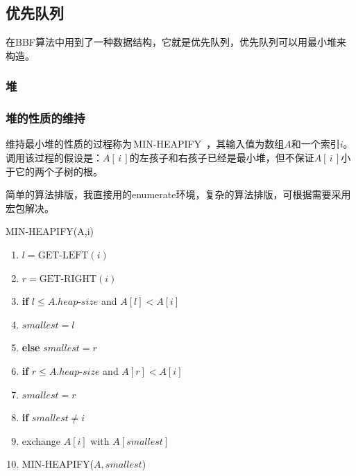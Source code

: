 \documentclass[10.5pt,a4paper]{article}
\numberwithin{equation}{section}
\numberwithin{figure}{section}
\numberwithin{table}{section}
\begin{document}
\subsection{优先队列}
在BBF算法中用到了一种数据结构，它就是优先队列，优先队列可以用最小堆来构造\cite{cormen2009introduction}。
\subsubsection{堆}
\subsubsection{堆的性质的维持}
维持最小堆的性质的过程称为\,MIN-HEAPIFY\ ，其输入值为数组$A$和一个索引$i$。调用该过程的假设是：$A[\,i\,]$的左孩子和右孩子已经是最小堆，但不保证$A[\,i\,]$小于它的两个子树的根。\par
简单的算法排版，我直接用的enumerate环境，复杂的算法排版，可根据需要采用宏包解决。\par
\noindent
MIN-HEAPIFY(A,i)
\begin{enumerate}
\item $l = \text{GET-LEFT}(i) $
\item $r = \text{GET-RIGHT}(i) $
\item {\bf if} $l \le A.heap\text{-}size$ and $A[l] < A[i]$
\item \hspace{2em} $smallest = l$
\item {\bf else} $smallest = r$
\item {\bf if} $r \le A.heap\text{-}size$ and $A[r] < A[i]$
\item \hspace{2em}  $smallest = r$
\item {\bf if} $smallest \ne i$
\item exchange $A[i]$ with $A[smallest]$
\item MIN-HEAPIFY($A, smallest$)
\end{enumerate}
\newpage
\end{document}
